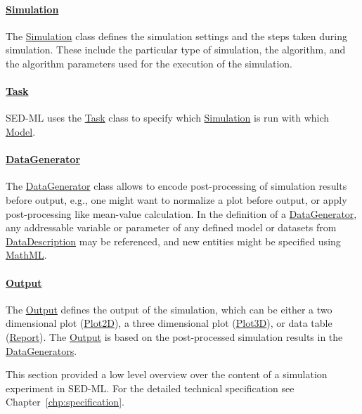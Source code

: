 \paragraph*{\hyperref[class:simulation]{Simulation}}
The \hyperref[class:simulation]{Simulation} class defines the simulation settings and the steps taken during simulation. These include the particular type of simulation, the algorithm, and the algorithm parameters used for the execution of the simulation.

\paragraph*{\hyperref[class:task]{Task}}
SED-ML uses the \hyperref[class:task]{Task} class to specify which \hyperref[class:simulation]{Simulation} is run with which \hyperref[class:model]{Model}.

\paragraph*{\hyperref[class:dataGenerator]{DataGenerator}}
The \hyperref[class:dataGenerator]{DataGenerator} class allows to encode post-processing of simulation results before output, e.g., one might want to normalize a plot before output, or apply post-processing like mean-value calculation. In the definition of a \hyperref[class:dataGenerator]{DataGenerator}, any addressable variable or parameter of any defined model or datasets from \hyperref[class:dataDescription]{DataDescription} may be referenced, and new entities might be specified using \hyperref[sec:mathML]{MathML}.

\paragraph*{\hyperref[class:output]{Output}}
The \hyperref[class:output]{Output} defines the output of the simulation, which can be either a two dimensional plot (\hyperref[class:plot2D]{Plot2D}), a three dimensional plot (\hyperref[class:plot3D]{Plot3D}), or data table (\hyperref[class:report]{Report}). The \hyperref[class:output]{Output} is based on the post-processed simulation results in the \hyperref[class:dataGenerator]{DataGenerators}.

This section provided a low level overview over the content of a simulation experiment in SED-ML. For the detailed technical specification see Chapter~\ref{chp:specification}. 

